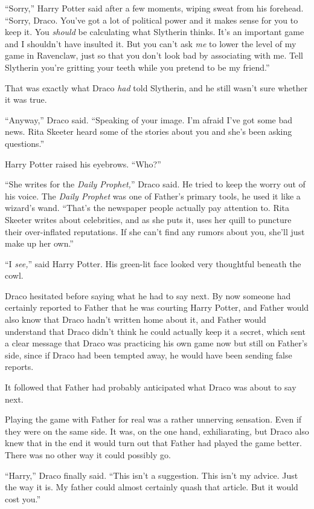 ``Sorry,'' Harry Potter said after a few moments, wiping sweat from his forehead. ``Sorry, Draco. You've got a lot of political power and it makes sense for you to keep it. You \emph{should} be calculating what Slytherin thinks. It's an important game and I shouldn't have insulted it. But you can't ask \emph{me} to lower the level of my game in Ravenclaw, just so that you don't look bad by associating with me. Tell Slytherin you're gritting your teeth while you pretend to be my friend.''

That was exactly what Draco \emph{had} told Slytherin, and he still wasn't sure whether it was true.

``Anyway,'' Draco said. ``Speaking of your image. I'm afraid I've got some bad news. Rita Skeeter heard some of the stories about you and she's been asking questions.''

Harry Potter raised his eyebrows. ``Who?''

``She writes for the \emph{Daily Prophet,}'' Draco said. He tried to keep the worry out of his voice. The \emph{Daily Prophet} was one of Father's primary tools, he used it like a wizard's wand. ``That's the newspaper people actually pay attention to. Rita Skeeter writes about celebrities, and as she puts it, uses her quill to puncture their over-inflated reputations. If she can't find any rumors about you, she'll just make up her own.''

``I \emph{see,}'' said Harry Potter. His green-lit face looked very thoughtful beneath the cowl.

Draco hesitated before saying what he had to say next. By now someone had certainly reported to Father that he was courting Harry Potter, and Father would also know that Draco hadn't written home about it, and Father would understand that Draco didn't think he could actually keep it a secret, which sent a clear message that Draco was practicing his own game now but still on Father's side, since if Draco had been tempted away, he would have been sending false reports.

It followed that Father had probably anticipated what Draco was about to say next.

Playing the game with Father for real was a rather unnerving sensation. Even if they were on the same side. It was, on the one hand, exhiliarating, but Draco also knew that in the end it would turn out that Father had played the game better. There was no other way it could possibly go.

``Harry,'' Draco finally said. ``This isn't a suggestion. This isn't my advice. Just the way it is. My father could almost certainly quash that article. But it would cost you.''

